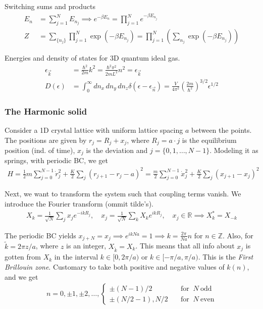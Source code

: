 \documentclass[a4paper, english, 12pt]{article}
\newcommand{\curly}[1]{\{ #1 \} }
\begin{document}
\begin{multicols*}{2}
Switching sums and products 
\begin{align*}
    E_n &= \sum_{j=1}^N E_{n_j} \implies e^{-\beta E_n} = \prod_{j=1}^N e^{-\beta E_{n_j}} \\
    Z &= \sum_{\curly{n_j}} \prod_{j=1}^N \exp(-\beta E_{n_j}) = \prod_{j=1}^N \left( \sum_{n_j} \exp(-\beta E_{n_j}) \right)
\end{align*}


Energies and density of states for 3D quantum ideal gas. 
\begin{align*}
    \epsilon_{\vec{k}} &= \frac{\hbar^2 }{2m}k^2 = \frac{\hbar^2 \pi^2}{2mL^2}n^2 = \epsilon_{\vec{k}} \\ 
    D(\epsilon) &= \int_0^\infty dn_x\,dn_y\,dn_z \delta(\epsilon-\epsilon_{\vec{n}}) = \frac{V}{4\pi^2} \left(\frac{2m}{\hbar^2}\right)^{3/2} \epsilon^{1/2}
\end{align*}


\subsubsection*{The Harmonic solid}
Consider a 1D crystal lattice with uniform lattice spacing $a$ between the points. The positions are given by $r_j = R_j + x_j$, where $R_j=a\cdot j$ is the equilibrium position (ind. of time), $x_j$ is the deviation and $j=\curly{0,1,\dots,N-1}$. Modeling it as springs, with periodic BC, we get 
\begin{align*}
    H = \frac{1}{2} m \sum_{j=0}^{N-1} \dot{r}_j^2 + \frac{K}{2} \sum_j (r_{j+1} - r_j - a)^2 = \frac{m}{2}\sum_{j=0}^{N-1} \dot{x}_j^2 + \frac{K}{2} \sum_j (x_{j+1}-x_j)^2
\end{align*}

Next, we want to transform the system such that coupling terms vanish. We introduce the Fourier transform (ommit tilde's).
\begin{align*}
    X_k = \frac{1}{\sqrt{N}} \sum_j x_j e^{-ikR_j},\quad x_j = \frac{1}{\sqrt{N}} \sum_k X_k e^{ikR_j},\quad x_j\in\mathbb{R}\implies X_k^* = X_{-k}
\end{align*}

The periodic BC yields $x_{j+N}=x_j\implies e^{ikNa}=1\implies k = \frac{2\pi}{Na}n$ for $n\in\mathbb{Z}$. Also, for $\tilde{k}=2\pi z/a$, where $z$ is an integer, $X_{\tilde{k}}=X_k$. This means that all info about $x_j$ is gotten from $X_k$ in the interval $k\in[0,2\pi/a)$ or $k\in[-\pi/a,\pi/a)$. This is the \textit{First Brillouin zone}. Customary to take both positive and negative values of $k(n)$, and we get 
\begin{align*}
    n = 0,\pm1,\pm2,\dots, \begin{cases}
        \pm(N-1)/2 \quad&\text{for }\: N\: \text{odd} \\ 
        \pm(N/2-1),N/2\quad&\text{for }\: N\: \text{even}
    \end{cases}
\end{align*}



\end{multicols*}
\end{document}

